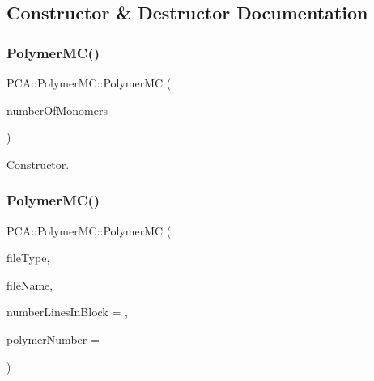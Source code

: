 \subsection{Constructor \& Destructor Documentation}
\hypertarget{class_p_c_a_1_1_polymer_m_c_a0d90616fbc7d2eaaeedbdce0bc9057f0}{}\label{class_p_c_a_1_1_polymer_m_c_a0d90616fbc7d2eaaeedbdce0bc9057f0} 
\subsubsection{\texorpdfstring{Polymer\+M\+C()}{PolymerMC()}\hspace{0.1cm}{\footnotesize\ttfamily [1/2]}}
{\footnotesize\ttfamily P\+C\+A\+::\+Polymer\+M\+C\+::\+Polymer\+MC (\begin{DoxyParamCaption}\item[{int}]{number\+Of\+Monomers }\end{DoxyParamCaption})}



Constructor. 

\hypertarget{class_p_c_a_1_1_polymer_m_c_a4617bc87ec890ae0817f2a1f20644611}{}\label{class_p_c_a_1_1_polymer_m_c_a4617bc87ec890ae0817f2a1f20644611} 
\subsubsection{\texorpdfstring{Polymer\+M\+C()}{PolymerMC()}\hspace{0.1cm}{\footnotesize\ttfamily [2/2]}}
{\footnotesize\ttfamily P\+C\+A\+::\+Polymer\+M\+C\+::\+Polymer\+MC (\begin{DoxyParamCaption}\item[{\hyperlink{class_p_c_a_1_1_polymer_a1df36a764fbf04ccd5cbe8edb49d43bd}{File\+Type}}]{file\+Type,  }\item[{char $\ast$}]{file\+Name,  }\item[{int}]{number\+Lines\+In\+Block = {},  }\item[{int}]{polymer\+Number = {} }\end{DoxyParamCaption})}

\hypertarget{class_p_c_a_1_1_polymer_m_c_a6ed770992221cd0a7a9e364d4d5fcda3}{}\label{class_p_c_a_1_1_polymer_m_c_a6ed770992221cd0a7a9e364d4d5fcda3} 
